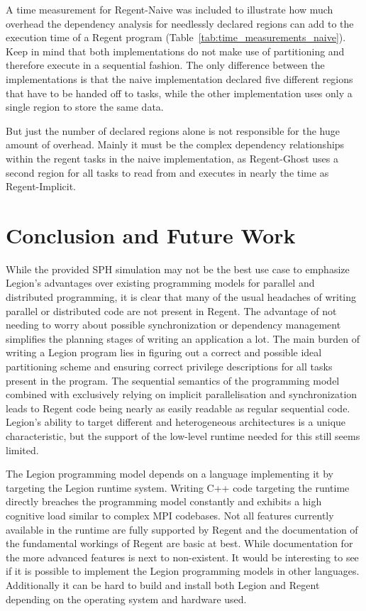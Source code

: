 \documentclass{article}      %
\begin{document}
A time measurement for Regent-Naive was included to illustrate how much overhead the dependency analysis for needlessly declared regions can add to the execution time of a Regent program (Table~\ref{tab:time_measurements_naive}). Keep in mind that both implementations do not make use of partitioning and therefore execute in a sequential fashion. The only difference between the implementations is that the naive implementation declared five different regions that have to be handed off to tasks, while the other implementation uses only a single region to store the same data.

But just the number of declared regions alone is not responsible for the huge amount of overhead. Mainly it must be the complex dependency relationships within the regent tasks in the naive implementation, as Regent-Ghost uses a second region for all tasks to read from and executes in nearly the time as Regent-Implicit.

\section{Conclusion and Future Work}
While the provided SPH simulation may not be the best use case to emphasize Legion's advantages over existing programming models for parallel and distributed programming, it is clear that many of the usual headaches of writing parallel or distributed code are not present in Regent. The advantage of not needing to worry about possible synchronization or dependency management simplifies the planning stages of writing an application a lot. The main burden of writing a Legion program lies in figuring out a correct and possible ideal partitioning scheme and ensuring correct privilege descriptions for all tasks present in the program. The sequential semantics of the programming model combined with exclusively relying on implicit parallelisation and synchronization leads to Regent code being nearly as easily readable as regular sequential code. Legion's ability to target different and heterogeneous architectures is a unique characteristic, but the support of the low-level runtime needed for this still seems limited.

The Legion programming model depends on a language implementing it by targeting the Legion runtime system. Writing C++ code targeting the runtime directly 
breaches the programming model constantly and exhibits a high cognitive load similar to complex MPI codebases. Not all features currently available in the runtime are fully supported by Regent and the documentation of the fundamental workings of Regent are basic at best. While documentation for the more advanced features is next to non-existent. It would be interesting to see if it is possible to implement the Legion programming models in other languages. Additionally it can be hard to build and install both Legion and Regent depending on the operating system and hardware used.
\end{document}
